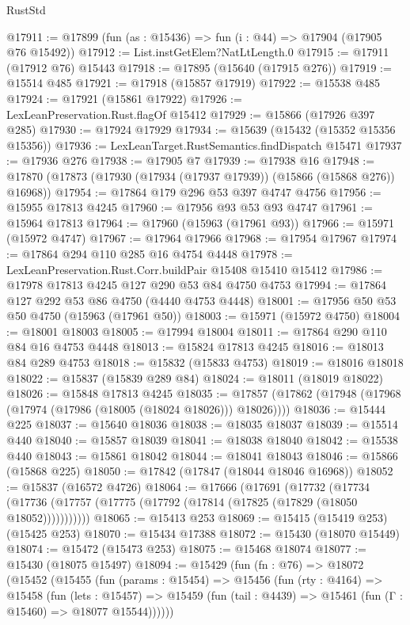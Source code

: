 \begin{lexlean}{RustStd}
\begin{coremodule}
@17911 := @17899 (fun (as : @15436) => fun (i : @44) => @17904 (@17905 @76 @15492))
@17912 := List.instGetElem?NatLtLength.{0}
@17915 := @17911 (@17912 @76) @15443
@17918 := @17895 (@15640 (@17915 @276))
@17919 := @15514 @485
@17921 := @17918 (@15857 @17919)
@17922 := @15538 @485
@17924 := @17921 (@15861 @17922)
@17926 := LexLeanPreservation.Rust.flagOf @15412
@17929 := @15866 (@17926 @397 @285)
@17930 := @17924 @17929
@17934 := @15639 (@15432 (@15352 @15356 @15356))
@17936 := LexLeanTarget.RustSemantics.findDispatch @15471
@17937 := @17936 @276
@17938 := @17905 @7
@17939 := @17938 @16
@17948 := @17870 (@17873 (@17930 (@17934 (@17937 @17939)) (@15866 (@15868 @276)) @16968))
@17954 := @17864 @179 @296 @53 @397 @4747 @4756
@17956 := @15955 @17813 @4245
@17960 := @17956 @93 @53 @93 @4747
@17961 := @15964 @17813
@17964 := @17960 (@15963 (@17961 @93))
@17966 := @15971 (@15972 @4747)
@17967 := @17964 @17966
@17968 := @17954 @17967
@17974 := @17864 @294 @110 @285 @16 @4754 @4448
@17978 := LexLeanPreservation.Rust.Corr.buildPair @15408 @15410 @15412
@17986 := @17978 @17813 @4245 @127 @290 @53 @84 @4750 @4753
@17994 := @17864 @127 @292 @53 @86 @4750 (@4440 @4753 @4448)
@18001 := @17956 @50 @53 @50 @4750 (@15963 (@17961 @50))
@18003 := @15971 (@15972 @4750)
@18004 := @18001 @18003
@18005 := @17994 @18004
@18011 := @17864 @290 @110 @84 @16 @4753 @4448
@18013 := @15824 @17813 @4245
@18016 := @18013 @84 @289 @4753
@18018 := @15832 (@15833 @4753)
@18019 := @18016 @18018
@18022 := @15837 (@15839 @289 @84)
@18024 := @18011 (@18019 @18022)
@18026 := @15848 @17813 @4245
@18035 := @17857 (@17862 (@17948 (@17968 (@17974 (@17986 (@18005 (@18024 @18026))) @18026))))
@18036 := @15444 @225
@18037 := @15640 @18036
@18038 := @18035 @18037
@18039 := @15514 @440
@18040 := @15857 @18039
@18041 := @18038 @18040
@18042 := @15538 @440
@18043 := @15861 @18042
@18044 := @18041 @18043
@18046 := @15866 (@15868 @225)
@18050 := @17842 (@17847 (@18044 @18046 @16968))
@18052 := @15837 (@16572 @4726)
@18064 := @17666
    (@17691
      (@17732
        (@17734 (@17736 (@17757 (@17775 (@17792 (@17814 (@17825 (@17829 (@18050 @18052)))))))))))
@18065 := @15413 @253
@18069 := @15415 (@15419 @253) (@15425 @253)
@18070 := @15434 @17388
@18072 := @15430 (@18070 @15449)
@18074 := @15472 (@15473 @253)
@18075 := @15468 @18074
@18077 := @15430 (@18075 @15497)
@18094 := @15429
    (fun (fn : @76) =>
    @18072
      (@15452
        (@15455
          (fun (params : @15454) =>
          @15456
            (fun (rty : @4164) =>
            @15458
              (fun (lets : @15457) =>
              @15459 (fun (tail : @4439) => @15461 (fun (Γ : @15460) => @18077 @15544))))))

\end{coremodule}
\end{lexlean}
